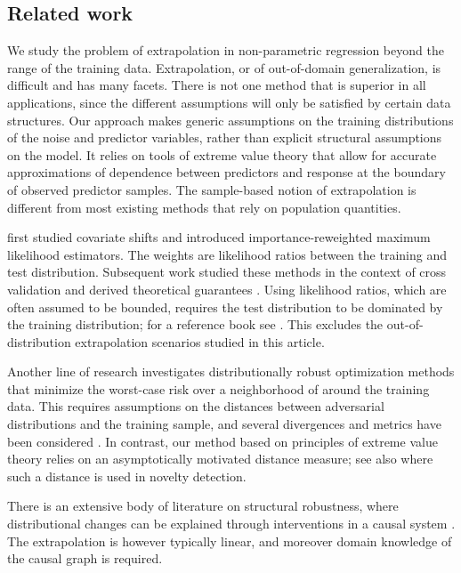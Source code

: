 \documentclass{statsoc}
\theoremstyle{break}
\begin{document}
\subsection{Related work}\label{sec:literature}
We study the problem of extrapolation in non-parametric regression beyond the range of the training data.  
Extrapolation, or of out-of-domain generalization, is difficult and has many facets. There is not one method that is superior in all applications, since the different assumptions will only be satisfied by certain data structures.
Our approach makes generic assumptions on the training distributions of the noise and predictor variables, rather than explicit structural assumptions on the model. It relies on tools of extreme value theory that allow for accurate approximations of dependence between predictors and response at the boundary of observed predictor samples. The sample-based notion of extrapolation is different from most existing methods that rely on population quantities. 


\cite{shimodaira:2000} first studied covariate shifts and introduced 
importance-reweighted maximum likelihood estimators. The weights 
are likelihood ratios between the training and test distribution. 
Subsequent work studied these methods in the context of cross validation \citep{sugiyama:krauledat:muller:2007} and derived theoretical guarantees \cite[e.g.][]{cortes:mansour:mohri:2010,ma:pathak:wainwright:2023}. 
Using likelihood ratios, which are often assumed to be bounded, requires the test distribution to be dominated by the training distribution; for a reference book see \cite{quinonero:sugiyama:schwaighofer:lawrence:2022}. This excludes the out-of-distribution extrapolation scenarios studied in this article.

Another line of research investigates distributionally robust optimization methods that minimize the worst-case risk over a neighborhood of around the training data. This requires assumptions on the distances between adversarial distributions and the training sample, and several divergences and metrics have been considered \citep{kuh2019, NIPS2016_4588e674}. In contrast, our method based on principles of extreme value theory relies on an asymptotically motivated distance measure; see also \cite{vig2020} where such a distance is used in novelty detection. 


There is an extensive body of literature on structural robustness, where distributional changes can be explained through interventions in a causal system
\citep[e.g.,][]{rothensausler:meinshausen:buhlmann:peters:2021,buhlmann:2020,christiansen:pfister:jakobsen:gnecco:peters:2021,gnecco:peters:engelke:pfister:2023}. The extrapolation is however typically linear, and moreover domain knowledge of the causal graph is required. 
\end{document}
